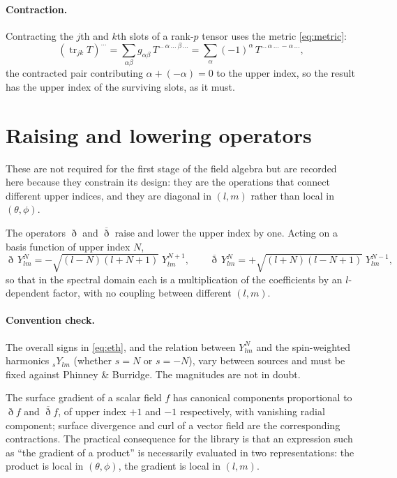\documentclass[11pt,a4paper]{article}
\newcommand{\conj}[1]{\overline{#1}}
\begin{document}
\paragraph{Contraction.}  Contracting the $j$th and $k$th slots of a
rank-$p$ tensor uses the metric \eqref{eq:metric}:
\begin{equation}
  \left(\operatorname{tr}_{jk} T\right)^{\ldots}
   = \sum_{\alpha\beta} g_{\alpha\beta}\,
      T^{\ldots\, \alpha \,\ldots\, \beta \,\ldots}
   = \sum_{\alpha} (-1)^{\alpha}\,
      T^{\ldots\, \alpha \,\ldots\, -\alpha \,\ldots} ,
\end{equation}
the contracted pair contributing $\alpha + (-\alpha) = 0$ to the upper
index, so the result has the upper index of the surviving slots, as it
must.

\section{Raising and lowering operators}
\label{sec:eth}

These are not required for the first stage of the field algebra but are
recorded here because they constrain its design: they are the operations
that connect different upper indices, and they are diagonal in $(l,m)$
rather than local in $(\theta,\phi)$.

The operators $\eth$ and $\conj{\eth}$ raise and lower the upper index by
one.  Acting on a basis function of upper index $N$,
\begin{equation}
  \eth\, Y^{N}_{lm} = -\sqrt{(l-N)(l+N+1)}\; Y^{N+1}_{lm},
  \qquad
  \conj{\eth}\, Y^{N}_{lm} = +\sqrt{(l+N)(l-N+1)}\; Y^{N-1}_{lm},
  \label{eq:eth}
\end{equation}
so that in the spectral domain each is a multiplication of the
coefficients by an $l$-dependent factor, with no coupling between
different $(l,m)$.

\paragraph{Convention check.}  The overall signs in \eqref{eq:eth}, and
the relation between $Y^{N}_{lm}$ and the spin-weighted harmonics
${}_{s}Y_{lm}$ (whether $s = N$ or $s = -N$), vary between sources and
must be fixed against Phinney \& Burridge.  The magnitudes are not in
doubt.

The surface gradient of a scalar field $f$ has canonical components
proportional to $\eth f$ and $\conj{\eth} f$, of upper index $+1$ and
$-1$ respectively, with vanishing radial component; surface divergence
and curl of a vector field are the corresponding contractions.  The
practical consequence for the library is that an expression such as ``the
gradient of a product'' is necessarily evaluated in two representations:
the product is local in $(\theta,\phi)$, the gradient is local in
$(l,m)$.
\end{document}
